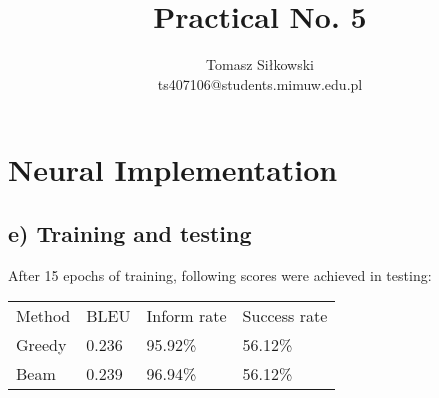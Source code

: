 \documentclass[12pt]{article}
\begin{document}
 
 
\title{Practical No. 5 }%
\author{Tomasz Siłkowski\\ %
ts407106@students.mimuw.edu.pl}
 
\maketitle

\setcounter{section}{1}
\section{Neural Implementation }
\subsection*{e) Training and testing}
After 15 epochs of training, following scores were achieved in testing:
\begin{table}[h]
\begin{tabular}{llll}
  Method & BLEU & Inform rate & Success rate \\
  Greedy & 0.236 & 95.92\% & 56.12\% \\
  Beam & 0.239 & 96.94\% & 56.12\% \\
\end{tabular}
\end{table}

 
\end{document}
